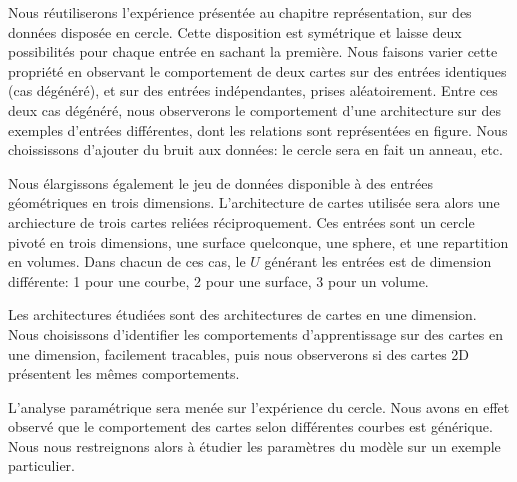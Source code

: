 Nous réutiliserons l'expérience présentée au chapitre représentation, sur des données disposée en cercle. Cette disposition est symétrique et laisse deux possibilités pour chaque entrée en sachant la première.
Nous faisons varier cette propriété en observant le comportement de deux cartes sur des entrées identiques (cas dégénéré), et sur des entrées indépendantes, prises aléatoirement. Entre ces deux cas dégénéré, nous observerons le comportement d'une architecture sur des exemples d'entrées différentes, dont les relations sont représentées en figure.
Nous choississons d'ajouter du bruit aux données: le cercle sera en fait un anneau, etc.

Nous élargissons également le jeu de données disponible à des entrées géométriques en trois dimensions. L'architecture de cartes utilisée sera alors une archiecture de trois cartes reliées réciproquement.
Ces entrées sont un cercle pivoté en trois dimensions, une surface quelconque, une sphere, et une repartition en volumes. Dans chacun de ces cas, le $U$ générant les entrées est de dimension différente: 1 pour une courbe,  2 pour une surface, 3 pour un volume.

Les architectures étudiées sont des architectures de cartes en une dimension. Nous choisissons d'identifier les comportements d'apprentissage sur des cartes en une dimension, facilement tracables, puis nous observerons si des cartes 2D présentent les mêmes comportements.

L'analyse paramétrique sera menée sur l'expérience du cercle. Nous avons en effet observé que le comportement des cartes selon différentes courbes est générique. Nous nous restreignons alors à étudier les paramètres du modèle sur un exemple particulier.

